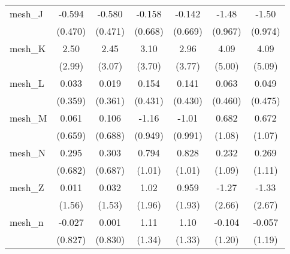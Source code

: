 \begin{tabular}{lcccccc}
   mesh\_J                                                     & -0.594        & -0.580       & -0.158        & -0.142        & -1.48         & -1.50\\   
                                                               & (0.470)       & (0.471)      & (0.668)       & (0.669)       & (0.967)       & (0.974)\\   
   mesh\_K                                                     & 2.50          & 2.45         & 3.10          & 2.96          & 4.09          & 4.09\\   
                                                               & (2.99)        & (3.07)       & (3.70)        & (3.77)        & (5.00)        & (5.09)\\   
   mesh\_L                                                     & 0.033         & 0.019        & 0.154         & 0.141         & 0.063         & 0.049\\   
                                                               & (0.359)       & (0.361)      & (0.431)       & (0.430)       & (0.460)       & (0.475)\\   
   mesh\_M                                                     & 0.061         & 0.106        & -1.16         & -1.01         & 0.682         & 0.672\\   
                                                               & (0.659)       & (0.688)      & (0.949)       & (0.991)       & (1.08)        & (1.07)\\   
   mesh\_N                                                     & 0.295         & 0.303        & 0.794         & 0.828         & 0.232         & 0.269\\   
                                                               & (0.682)       & (0.687)      & (1.01)        & (1.01)        & (1.09)        & (1.11)\\   
   mesh\_Z                                                     & 0.011         & 0.032        & 1.02          & 0.959         & -1.27         & -1.33\\   
                                                               & (1.56)        & (1.53)       & (1.96)        & (1.93)        & (2.66)        & (2.67)\\   
   mesh\_n                                                     & -0.027        & 0.001        & 1.11          & 1.10          & -0.104        & -0.057\\   
                                                               & (0.827)       & (0.830)      & (1.34)        & (1.33)        & (1.20)        & (1.19)\\   

\end{tabular}
